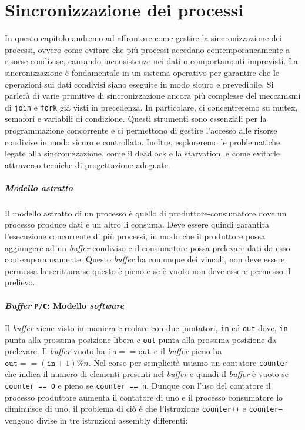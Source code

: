 \chapter{Sincronizzazione dei processi}
In questo capitolo andremo ad affrontare come gestire la sincronizzazione dei processi, ovvero come evitare che più processi accedano contemporaneamente a risorse condivise, causando inconsistenze nei dati o comportamenti imprevisti. La sincronizzazione è fondamentale in un sistema operativo per garantire che le operazioni sui dati condivisi siano eseguite in modo sicuro e prevedibile. Si parlerà di varie primitive di sincronizzazione ancora più complesse del meccanismi di \texttt{join} e \texttt{fork} già visti in precedenza. In particolare, ci concentreremo su mutex, semafori e variabili di condizione. Questi strumenti sono essenziali per la programmazione concorrente e ci permettono di gestire l'accesso alle risorse condivise in modo sicuro e controllato. Inoltre, esploreremo le problematiche legate alla sincronizzazione, come il deadlock e la starvation, e come evitarle attraverso tecniche di progettazione adeguate.
\paragraph{Modello astratto} Il modello astratto di un processo è quello di produttore-consumatore dove un processo produce dati e un altro li consuma. Deve essere quindi garantita l'esecuzione concorrente di più processi, in modo che il produttore possa aggiungere ad un \textit{buffer} condiviso e il consumatore possa prelevare dati da esso contemporaneamente. Questo \textit{buffer} ha comunque dei vincoli, non deve essere permessa la scrittura se questo è pieno e se è vuoto non deve essere permesso il prelievo.
\subsubsection{\textit{Buffer} \texttt{P/C}: Modello \textit{software}}
    Il \textit{buffer} viene visto in maniera circolare con due puntatori, \texttt{in} ed \texttt{out} dove, \texttt{in} punta alla prossima posizione libera e \texttt{out} punta alla prossima posizione da prelevare. Il \textit{buffer} vuoto ha $\texttt{in} == \texttt{out}$ e il \textit{buffer} pieno ha $\texttt{out} == (\texttt{in} + 1)\% n$. Nel corso per semplicità usiamo un contatore \texttt{counter} che indica il numero di elementi presenti nel \textit{buffer} e quindi il \textit{buffer} è vuoto se \texttt{counter == 0} e pieno se \texttt{counter == n}.
    Dunque con l'uso del contatore il processo produttore aumenta il contatore di uno e il processo consumatore lo diminuisce di uno, il problema di ciò è che l'istruzione \texttt{counter++} e \texttt{counter--} vengono divise in tre istruzioni assembly differenti:

